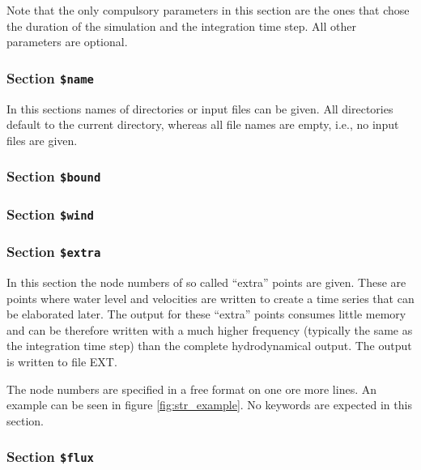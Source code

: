 \documentclass{report}
\begin{document}
Note that the only compulsory parameters in this section are 
the ones that chose the duration of the simulation and the
integration time step. All other parameters are optional.



\subsubsection{Section {\tt \$name}}

In this sections names of directories or input files can be
given. All directories default to the current directory,
whereas all file names are empty, i.e., no input files are
given.




\subsubsection{Section {\tt \$bound}}




\subsubsection{Section {\tt \$wind}}





\subsubsection{Section {\tt \$extra}}

In this section the node numbers of so called ``extra'' points are given. 
These are points where water level and velocities are written to create
a time series that can be elaborated later. The output for these ``extra''
points consumes little memory and can be therefore written with a
much higher frequency (typically the same as the integration time step)
than the complete hydrodynamical output. The output is written
to file EXT.

The node numbers are specified in a free format on one ore more lines.
An example can be seen in figure \ref{fig:str_example}. No keywords
are expected in this section.


\subsubsection{Section {\tt \$flux}}
\end{document}
